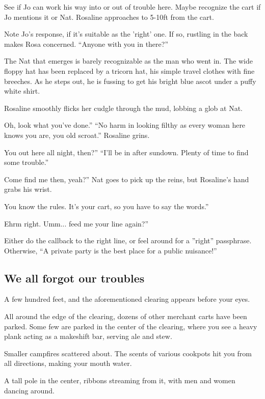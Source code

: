 \begin{multicols}{2}
  See if Jo can work his way into or out of trouble here.
  Maybe recognize the cart if Jo mentions it or Nat.
  Rosaline approaches to 5-10ft from the cart.
  
  Note Jo's response, if it's suitable as the 'right' one.
  If so, rustling in the back makes Rosa concerned.
  ``Anyone with you in there?''
  
  \begin{aloud}
    The Nat that emerges is barely recognizable as the man who went in.
    The wide floppy hat has been replaced by a tricorn hat, his simple travel clothes with fine breeches.
    As he steps out, he is fussing to get his bright blue ascot under a puffy white shirt.
  \end{aloud}

  Rosaline smoothly flicks her cudgle through the mud, lobbing a glob at Nat.
  
  Oh, look what you've done.''  ``No harm in looking filthy as every woman here knows you are, you old scroat.''  Rosaline grins.
  
  You out here all night, then?''  ``I'll be in after sundown.  Plenty of time to find some trouble.''
  
  Come find me then, yeah?''  Nat goes to pick up the reins, but Rosaline's hand grabs his wrist.
  
  You know the rules.  It's your cart, so you have to say the words.''
  
  Ehrm right.  Umm... feed me your line again?''
  
  Either do the callback to the right line, or feel around for a ''right'' passphrase.  Otherwise, ``A private party is the best place for a public nuisance!''
\vfill\null\columnbreak
\subsection{We all forgot our troubles}
  \begin{aloud}
  A few hundred feet, and the aforementioned clearing appears before your eyes.

  All around the edge of the clearing, dozens of other merchant carts have been parked.
  Some few are parked in the center of the clearing, where you see a heavy plank acting as a makeshift bar, serving ale and stew.

  Smaller campfires scattered about.
  The scents of various cookpots hit you from all directions, making your mouth water.
  
  A tall pole in the center, ribbons streaming from it, with men and women dancing around.


\end{aloud}
\end{multicols}
